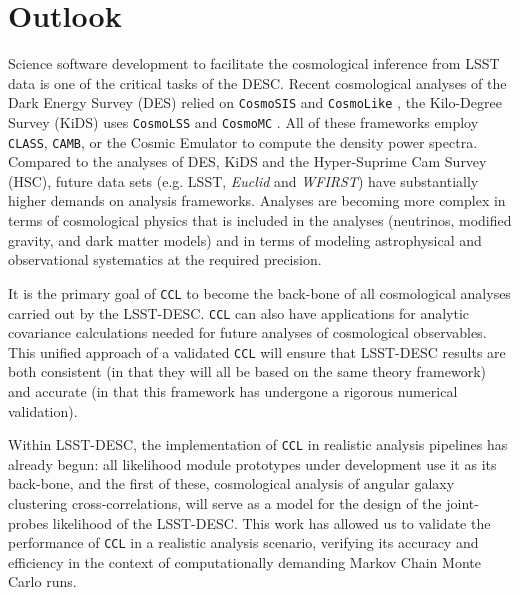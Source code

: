 \documentclass[\docopts]{\docclass}
\newcommand{\ccl}{{\tt CCL}\xspace}
\newcommand{\class}{{\tt CLASS}\xspace}
\newcommand{\camb}{{\tt CAMB}\xspace}
\begin{document}
\section{Outlook}
\label{sec:conclusion}

Science software development to facilitate the cosmological inference from LSST data is one of the critical tasks of the DESC. Recent cosmological analyses of the Dark Energy Survey (DES) relied on {\tt CosmoSIS} \citep{Zuntz14} and {\tt CosmoLike} \citep{krause17}, the Kilo-Degree Survey (KiDS) uses {\tt CosmoLSS} \citep{Joudaki18} and {\tt CosmoMC} \citep{Lewis02}. All of these frameworks employ \class, \camb \citep{Challinor2005}, or the Cosmic Emulator to compute the density power spectra. Compared to the analyses of DES, KiDS and the Hyper-Suprime Cam Survey (HSC), future data sets (e.g. LSST, {\it Euclid} and {\it WFIRST}) have substantially higher demands on analysis frameworks. Analyses are becoming more complex in terms of cosmological physics that is included in the analyses (neutrinos, modified gravity, and dark matter models) and in terms of modeling astrophysical and observational systematics at the required precision. 

It is the primary goal of \ccl to become the back-bone of all cosmological analyses carried out by the LSST-DESC. \ccl can also have applications for analytic covariance calculations needed for future analyses of cosmological observables. This unified approach of a validated \ccl will ensure that LSST-DESC results are both consistent (in that they will all be based on the same theory framework) and accurate (in that this framework has undergone a rigorous numerical validation).

Within LSST-DESC, the implementation of \ccl in realistic analysis pipelines has already begun: all likelihood module prototypes under development use it as its back-bone, and the first of these, cosmological analysis of angular galaxy clustering cross-correlations, will serve as a model for the design of the joint-probes likelihood of the LSST-DESC. This work has allowed us to validate the performance of \ccl in a realistic analysis scenario, verifying its accuracy and efficiency in the context of computationally demanding Markov Chain Monte Carlo runs. 
\end{document}
